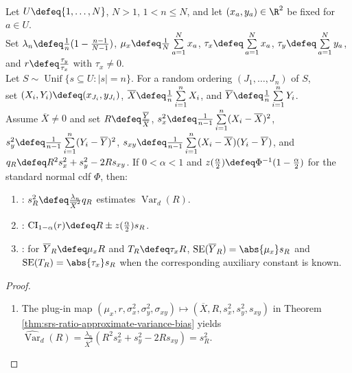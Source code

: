 \begin{corollary} \label{cor:ratio-estimated-standard-error} \\
Let $U\defeq\{1,\ldots,N\}$, $N>1$, $1<n\leq N$, and let $(x_a,y_a)\in\R^2$ be fixed for $a\in U$.\\
Set $\lambda_n\defeq\frac1n(1-\frac{n-1}{N-1})$, $\mu_x\defeq\frac1N\sum\limits_{a=1}^{N}x_a$, $\tau_x\defeq\sum\limits_{a=1}^{N}x_a$, $\tau_y\defeq\sum\limits_{a=1}^{N}y_a$, and $r\defeq\frac{\tau_y}{\tau_x}$ with $\tau_x\neq0$.\\
Let $S\sim\operatorname{Unif}\{s\subseteq U:|s|=n\}$. For a random ordering $(J_1,\ldots,J_n)$ of $S$,\\
set $(X_i,Y_i)\defeq(x_{J_i},y_{J_i})$, $\overline{X}\defeq\frac1n\sum\limits_{i=1}^{n}X_i$, and $\overline{Y}\defeq\frac1n\sum\limits_{i=1}^{n}Y_i$.\\
Assume $\overline{X}\neq0$ and set $R\defeq\frac{\overline{Y}}{\overline{X}}$, $s_x^2\defeq\frac{1}{n-1}\sum\limits_{i=1}^{n}(X_i-\overline{X})^2$, $s_y^2\defeq\frac{1}{n-1}\sum\limits_{i=1}^{n}(Y_i-\overline{Y})^2$, $s_{xy}\defeq\frac{1}{n-1}\sum\limits_{i=1}^{n}(X_i-\overline{X})(Y_i-\overline{Y})$, and $q_R\defeq R^2s_x^2+s_y^2-2Rs_{xy}$. If $0<\alpha<1$ and $z(\frac{\alpha}{2})\defeq\Phi^{-1}(1-\frac{\alpha}{2})$ for the standard normal cdf $\Phi$, then:
\begin{enumerate}[label=(\roman*)]
\setlength{\itemsep}{0pt}
\item {}: $s_R^2\defeq\frac{\lambda_n}{\overline{X}^2}q_R$ estimates $\operatorname{Var}_d(R)$.
\item {}: $\operatorname{CI}_{1-\alpha}(r)\defeq R\pm z(\frac{\alpha}{2})s_R$.
\item {}: for $\overline{Y}_R\defeq\mu_xR$ and $T_R\defeq\tau_xR$, $\operatorname{SE}(\overline{Y}_R)=\abs{\mu_x}s_R$ and $\operatorname{SE}(T_R)=\abs{\tau_x}s_R$ when the corresponding auxiliary constant is known.
\end{enumerate}
\begin{proof}
\begin{enumerate}[label=(\roman*)]
\setlength{\itemsep}{0pt}
\item The plug-in map $(\mu_x,r,\sigma_x^2,\sigma_y^2,\sigma_{xy})\mapsto(\overline{X},R,s_x^2,s_y^2,s_{xy})$ in Theorem \ref{thm:srs-ratio-approximate-variance-bias} yields\\
$\widehat{\operatorname{Var}}_d(R)=\frac{\lambda_n}{\overline{X}^2}(R^2s_x^2+s_y^2-2Rs_{xy})=s_R^2$.

\end{enumerate}
\end{proof}
\end{corollary}
